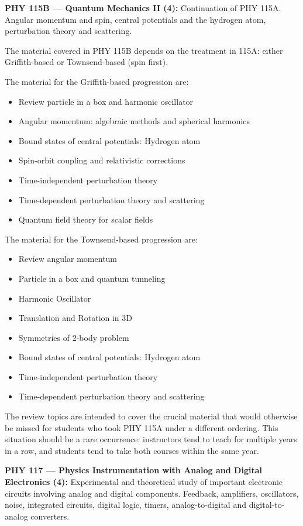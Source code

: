 \documentclass[12pt]{article}
\begin{document}
\vskip 1cm
\noindent
{\bf PHY 115B --- Quantum Mechanics II (4):}
Continuation of PHY 115A.  Angular momentum and spin, central potentials and the hydrogen atom, perturbation theory and scattering.

The material covered in PHY 115B depends on the treatment in 115A: either Griffith-based or Townsend-based (spin first).

The material for the Griffith-based progression are:
\begin{itemize}
\item Review particle in a box and harmonic oscillator 
\item Angular momentum: algebraic methods and spherical harmonics
\item Bound states of central potentials: Hydrogen atom
\item Spin-orbit coupling and relativistic corrections
\item Time-independent perturbation theory
\item Time-dependent perturbation theory and scattering
\item Quantum field theory for scalar fields
\end{itemize}

The material for the Townsend-based progression are:
\begin{itemize}
\item Review angular momentum 
\item Particle in a box and quantum tunneling
\item Harmonic Oscillator
\item Translation and Rotation in 3D
\item Symmetries of 2-body problem 
\item Bound states of central potentials: Hydrogen atom
\item Time-independent perturbation theory
\item Time-dependent perturbation theory and scattering
\end{itemize}

The review topics are intended to cover the crucial material that would
otherwise be missed for students who took PHY 115A under a different
ordering.  This situation should be a rare occurrence: instructors tend
to teach for multiple years in a row, and students tend to take both
courses within the same year.

\vskip 1cm
\noindent
{\bf PHY 117 --- Physics Instrumentation with Analog and Digital Electronics (4):}  
Experimental and theoretical study of important electronic circuits
involving analog and digital components.  Feedback, amplifiers,
oscillators, noise, integrated circuits, digital logic, timers,
analog-to-digital and digital-to-analog converters.
\end{document}
